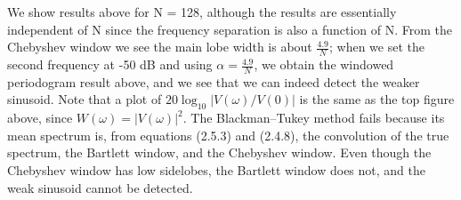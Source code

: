 \documentclass[UTF-8, a4paper, 12pt]{ctexart}
\begin{document}
We show results above for N = 128, although the results are essentially independent of N since the frequency separation is also a function of N. From the Chebyshev window we see the main lobe width is about $\frac{4.9}{N}$; when we set the second frequency at -50 dB and using $\alpha=\frac{4.9}{N}$, we obtain the windowed periodogram result above, and we see that we can indeed detect the weaker sinusoid. Note that a plot of $20\log_{10} |V (\omega)/V (0)|$ is the same as the top figure above, since $W(\omega) = |V (\omega)|^2$. The Blackman–Tukey method fails because its mean spectrum is, from equations (2.5.3) and (2.4.8), the convolution of the true spectrum, the Bartlett window, and the Chebyshev window. Even though the Chebyshev window has low sidelobes, the Bartlett window does not, and the weak sinusoid cannot be detected.
\end{document}
